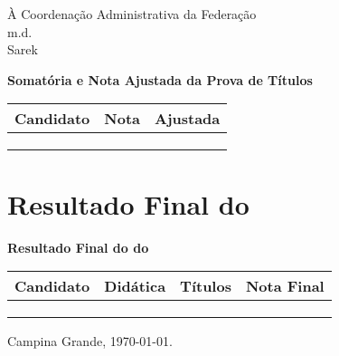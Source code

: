 \documentclass[10pt]{uaefata}
\begin{document}
\begin{letter}{À Coordenação Administrativa da Federação \\
			m.d.\\
			Sarek\\}
\begin{center}

\textbf{Somatória e Nota Ajustada da Prova de Títulos}

\begin{tabular}{|l|c|c|}
	\hline
	\textbf{Candidato}	&	\textbf{Nota}	&	\textbf{Ajustada}	\\
	\hline
	\cdta	&	\cdtanto	&	\cdtant	\\
	\cdtb	&	\cdtbnto	&	\cdtbnt	\\
	\cdtc	&	\cdtcnto	&	\cdtcnt	\\
	\hline
\end{tabular}

\end{center}


\section{Resultado Final do \concurso}


\bigskip

\begin{center}

\textbf{Resultado Final do \concurso do \edital}

\begin{tabular}{|l|c|c|c|}
	\hline
	\textbf{Candidato}	&	\textbf{Didática}	&	\textbf{Títulos}	&	\textbf{Nota Final}	\\
	\hline
	\cdta	&	\cdtand	&	\cdtant	&	\cdtanf	\\
	\cdtb	&	\cdtbnd	&	\cdtbnt	&	\cdtbnf	\\
	\cdtc	&	\cdtcnd	&	\cdtcnt	&	\cdtcnf	\\
	\hline
\end{tabular}




\end{center}

\newpage

		
		\closing{Campina Grande, \today.}
		
		
		
		
	\end{letter}
	
\end{document}
